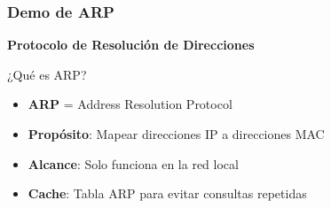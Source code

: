 \documentclass[aspectratio=169]{beamer}
\begin{document}
      \begin{frame}
        \frametitle{Demo de ARP}
        
        \begin{center}
        \Large \textbf{Protocolo de Resolución de Direcciones}
        \end{center}
        
        \begin{block}{¿Qué es ARP?}
        \begin{itemize}
        \item \textbf{ARP} = Address Resolution Protocol
        \item \textbf{Propósito}: Mapear direcciones IP a direcciones MAC
        \item \textbf{Alcance}: Solo funciona en la red local
        \item \textbf{Cache}: Tabla ARP para evitar consultas repetidas
        \end{itemize}
        \end{block}
        
        \end{frame}
        
\end{document}
